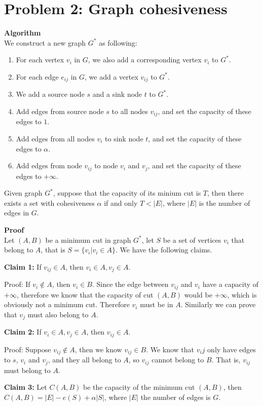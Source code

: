 \documentclass{article}
\newcommand{\Proof}{\vspace{0.3cm} \noindent\textbf{Proof} \\}
\newcommand{\Algorithm}{\textbf{Algorithm} \\}
\begin{document}
\section*{Problem 2: Graph cohesiveness}
\Algorithm
We construct a new graph $G^*$ as following:
\begin{enumerate}
  \item For each vertex $v_i$ in $G$, we also add a corresponding vertex $v_i$ to $G^*$.
  \item For each edge $e_{ij}$ in $G$, we add a vertex $v_{ij}$ to $G^*$.  
  \item We add a source node $s$ and a sink node $t$ to $G^*$.
  \item Add edges from source node $s$ to all nodes $v_{ij}$, and set the capacity of
    these edges to $1$.
  \item Add edges from all nodes $v_i$ to sink node $t$, and set the capacity of these edges to
    $\alpha$.
  \item Add edges from node $v_{ij}$ to node $v_i$ and $v_j$, and set the capacity of these edges
   to $+\infty$.   
\end{enumerate}
Given graph $G^*$, suppose that the capacity of its minium cut is $T$, then there exists a
set with cohesiveness $\alpha$ if and only $T < |E|$, where $|E|$ is the number of edges in $G$. 

\Proof
Let $(A, B)$ be a minimum cut in graph $G^*$, let $S$ be a set of vertices $v_i$ that belong to $A$,
that is $S = \{v_i | v_i \in A \}$. We have the following claims.

\textbf{Claim 1:} If $v_{ij}\in A$, then $v_i \in A, v_j \in A$.

Proof: If $v_i \notin A$, then $v_i \in B$. Since the edge between $v_{ij}$ and $v_i$ have a
capacity of $+\infty$, therefore we know that the capacity of cut $(A, B)$ would be $+\infty$, which
is obviously not a minimum cut. Therefore $v_i$ must be in $A$. Similarly we can prove that $v_j$
must also belong to $A$.   

\textbf{Claim 2:} If $v_i \in A, v_j \in A$, then $v_{ij} \in A$.

Proof: Suppose $v_{ij} \notin A$, then we know $v_{ij} \in B$. We know that $v_ij$ only have edges
to $s$, $v_i$ and $v_j$, and they all belong to $A$, so $v_{ij}$ cannot belong to $B$. That is,
$v_{ij}$ must belong to $A$. 

\textbf{Claim 3:} Let $C(A, B)$ be the capacity of the minimum cut $(A,B)$, then $C(A, B) = |E| -
e(S) + \alpha|S|$, where $|E|$ the number of edges is $G$. 
\end{document}
